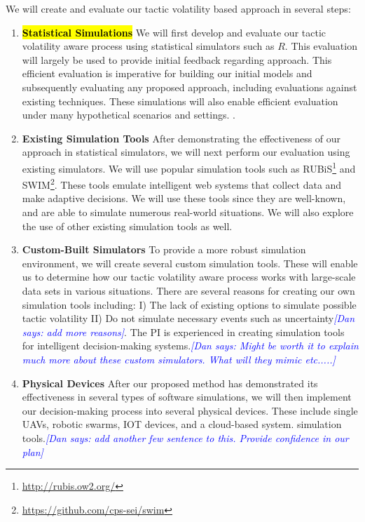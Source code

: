 \documentclass{article}
\newcommand{\dan}[1]{\textcolor{blue}{{\it [Dan says: #1]}}}
\begin{document}
We will create and evaluate our tactic volatility based approach in several steps:

\begin{enumerate}[noitemsep]

	\item \textbf{\hl{Statistical Simulations}} We will first develop and evaluate our tactic volatility aware process using statistical simulators such as $R$. This evaluation will largely be used to provide initial feedback regarding approach. This efficient evaluation is imperative for building our initial models and subsequently evaluating any proposed approach, including evaluations against existing techniques. These simulations will also enable efficient evaluation under many hypothetical scenarios and settings. .

	\item \textbf{Existing Simulation Tools} After demonstrating the effectiveness of our approach in statistical simulators, we will next perform our evaluation using existing simulators. We will use popular simulation tools such as RUBiS\footnote{\url{http://rubis.ow2.org/}} and SWIM\footnote{\url{https://github.com/cps-sei/swim}}. These tools emulate intelligent web systems that collect data and make adaptive decisions. We will use these tools since they are well-known, and are able to simulate numerous real-world situations. We will also explore the use of other existing simulation tools as well. 

	\item \textbf{Custom-Built Simulators} To provide a more robust simulation environment, we will create several custom simulation tools. These will enable us to determine how our tactic volatility aware process works with large-scale data sets in various situations. There are several reasons for creating our own simulation tools including: I) The lack of existing options to simulate possible tactic volatility II) Do not simulate necessary events such as uncertainty\dan{add more reasons}. The PI is experienced in creating simulation tools for intelligent decision-making systems.\dan{Might be worth it to explain much more about these custom simulators. What will they mimic etc.....} %
           
	\item \textbf{Physical Devices} After our proposed method has demonstrated its effectiveness in several types of software simulations, we will then implement our decision-making process into several physical devices. These include single UAVs, robotic swarms, IOT devices, and a cloud-based system. simulation tools.\dan{add another few sentence to this. Provide confidence in our plan} 

\end{enumerate}
\end{document}
